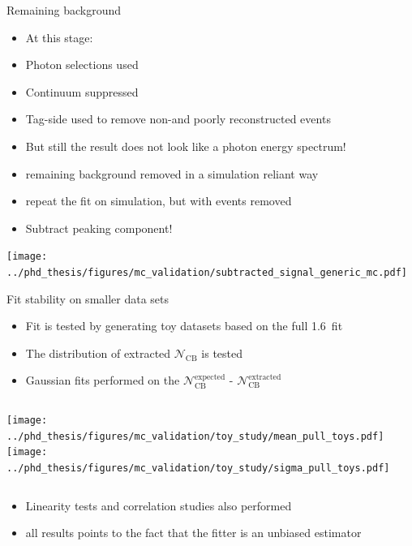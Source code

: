 \documentclass[xcolor=dvipsnames]{beamer}
\begin{document}
\begin{frame}{Remaining background}
\scriptsize\centering
   \begin{itemize}
      \item At this stage:
      \item[\ra] Photon selections used
      \item[\ra] Continuum suppressed
      \item[\ra] Tag-side used to remove non-\B and poorly reconstructed \B events
      \item[\ra] But still the result does not look like a photon energy spectrum!   
      \item[\ra] remaining background removed in a simulation reliant way
      \item[\ra] repeat the fit on simulation, but with \BtoXsgamma events removed
      \item[\ra] Subtract peaking component!  
   \end{itemize}


   \texttt{[image: ../phd\_thesis/figures/mc\_validation/subtracted\_signal\_generic\_mc.pdf]}

\end{frame}

\begin{frame}{Fit stability on smaller data sets}
\scriptsize\centering
   \begin{itemize}
      \item Fit is tested by generating toy datasets based on the full 1.6~\invab fit
      \item The distribution of extracted $\mathcal{N}_{\mathrm{CB}}$ is tested
      \item Gaussian fits performed on the $\mathcal{N}_{\mathrm{CB}}^{\mathrm{expected}}$ - $\mathcal{N}_{\mathrm{CB}}^{\mathrm{extracted}}$
   \end{itemize}

\begin{columns}
   \texttt{[image: ../phd\_thesis/figures/mc\_validation/toy\_study/mean\_pull\_toys.pdf]}
   \texttt{[image: ../phd\_thesis/figures/mc\_validation/toy\_study/sigma\_pull\_toys.pdf]}
\end{columns}

\begin{itemize}
   \item Linearity tests and correlation studies also performed
   \item[\ra] all results points to the fact that the fitter is an unbiased estimator
\end{itemize}





\end{frame}
\end{document}
